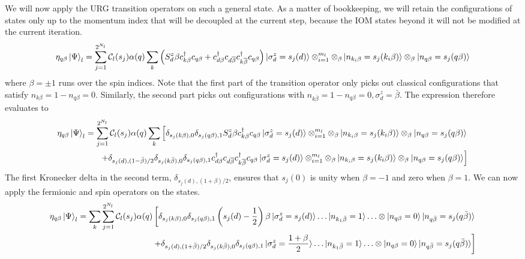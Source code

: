 We will now apply the URG transition operators on such a general state. As a matter of bookkeeping, we will retain the configurations of states only up to the momentum index that will be decoupled at the current step, because the IOM states beyond it will not be modified at the current iteration.
\begin{equation}\begin{aligned}
	\eta_{q\beta} \ket{\Psi}_l = \sum_{j=1}^{2^{N_l}} \mathcal{C}_l(s_j) \alpha(q)\sum_{k} \left( S_d^z \beta c^\dagger_{k\beta}c_{q\beta} + c^\dagger_{d\beta}c_{d\overline\beta}c^\dagger_{k\overline\beta}c_{q\beta}\right) \ket{\sigma^z_d=s_j(d)}\otimes_{i=1}^{m_l}\otimes_{\beta}\ket{n_{k_i\beta}=s_j(k_i\beta) }\otimes_{\beta}\ket{n_{q\beta}=s_j(q\beta)}
\end{aligned}\end{equation}
where \(\beta = \pm 1\) runs over the spin indices. Note that the first part of the transition operator only picks out classical configurations that satisfy \(n_{k\beta} = 1 - n_{q\beta} = 0\). Similarly, the second part picks out configurations with \(n_{k\bar\beta} = 1 - n_{q\beta} = 0, \sigma_d^z = \bar\beta\). The expression therefore evaluates to 
\begin{equation}\begin{aligned}
	\eta_{q\beta} \ket{\Psi}_l = \sum_{j=1}^{2^{N_l}} \mathcal{C}_l(s_j) \alpha(q)\sum_{k} \left[ \delta_{s_j(k\beta),0}\delta_{s_j(q\beta),1} S_d^z \beta c^\dagger_{k\beta}c_{q\beta} \ket{\sigma^z_d=s_j(d)}\otimes_{i=1}^{m_l}\otimes_{\beta}\ket{n_{k_i\beta}=s_j(k_i\beta) }\otimes_{\beta}\ket{n_{q\beta}=s_j(q\beta)} \right.\\
	\left.+ \delta_{s_j(d),(1 - \bar\beta)/2}\delta_{s_j(k\bar\beta),0}\delta_{s_j(q\beta),1}c^\dagger_{d\beta}c_{d\overline\beta}c^\dagger_{k\overline\beta}c_{q\beta} \ket{\sigma^z_d=s_j(d)}\otimes_{i=1}^{m_l}\otimes_{\beta}\ket{n_{k_i\beta}=s_j(k_i\beta) }\otimes_{\beta}\ket{n_{q\beta}=s_j(q\beta)}\right]
\end{aligned}\end{equation}
The first Kronecker delta in the second term, \(\delta_{s_j(d),(1 + \beta)/2}\), ensures that \(s_j(0)\) is unity when \(\beta = -1\) and zero when \(\beta = 1\). We can now apply the fermionic and spin operators on the states.
\begin{equation}\begin{aligned}
	\eta_{q\beta} \ket{\Psi}_l = \sum_{k} \sum_{j=1}^{2^{N_l}} \mathcal{C}_l(s_j) \alpha(q)\left[ \delta_{s_j(k\beta),0}\delta_{s_j(q\beta),1} \left(s_j(d) - \frac{1}{2}\right)\beta \ket{\sigma^z_d=s_j(d)}\ldots \ket{n_{k_1\bar\beta}=1 }\ldots \otimes\ket{n_{q\beta}=0}\ket{n_{q\bar\beta}=s_j(q\bar\beta)} \right.\\
	\left.+ \delta_{s_j(d),(1 + \bar\beta)/2}\delta_{s_j(k\bar\beta),0}\delta_{s_j(q\beta),1} \ket{\sigma^z_d=\frac{1 + \beta}{2}}\ldots \ket{n_{k_1\bar\beta}=1 }\ldots \otimes\ket{n_{q\beta}=0}\ket{n_{q\bar\beta}=s_j(q\bar\beta)}\right]
\end{aligned}\end{equation}
